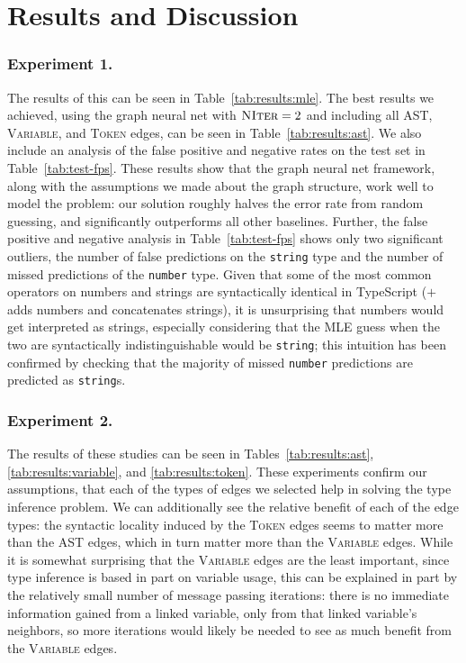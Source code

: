 \section{Results and Discussion}
\label{sec:results}
\subsubsection{Experiment 1.}
The results of this can be seen in Table~\ref{tab:results:mle}.
The best results we achieved, using the graph neural net with $\textsc{NIter}=2$ and including all AST, \textsc{Variable}, and \textsc{Token} edges, can be seen in Table~\ref{tab:results:ast}.
We also include an analysis of the false positive and negative rates on the test set in Table~\ref{tab:test-fps}.
These results show that the graph neural net framework, along with the assumptions we made about the graph structure, work well to model the problem: our solution roughly halves the error rate from random guessing, and significantly outperforms all other baselines.
Further, the false positive and negative analysis in Table~\ref{tab:test-fps} shows only two significant outliers, the number of false predictions on the \texttt{string} type and the number of missed predictions of the \texttt{number} type.
Given that some of the most common operators on numbers and strings are syntactically identical in TypeScript ($+$ adds numbers and concatenates strings), it is unsurprising that numbers would get interpreted as strings, especially considering that the MLE guess when the two are syntactically indistinguishable would be \texttt{string}; this intuition has been confirmed by checking that the majority of missed \texttt{number} predictions are predicted as \texttt{string}s.

\subsubsection{Experiment 2.} The results of these studies can be seen in Tables~\ref{tab:results:ast}, \ref{tab:results:variable}, and \ref{tab:results:token}.
These experiments confirm our assumptions, that each of the types of edges we selected help in solving the type inference problem.
We can additionally see the relative benefit of each of the edge types: the syntactic locality induced by the \textsc{Token} edges seems to matter more than the AST edges, which in turn matter more than the \textsc{Variable} edges.
While it is somewhat surprising that the \textsc{Variable} edges are the least important, since type inference is based in part on variable usage, this can be explained in part by the relatively small number of message passing iterations: there is no immediate information gained from a linked variable, only from that linked variable's neighbors, so more iterations would likely be needed to see as much benefit from the \textsc{Variable} edges.

